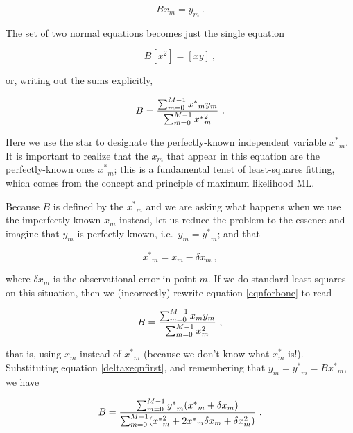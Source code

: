 \documentclass[psfig,preprint]{aastex}
\begin{document}
\begin{mathletters}
\begin{equation}
B x_m = y_m \ .
\end{equation}

\noindent The set of two normal equations becomes just the single equation

\begin{equation}
B [x^2] = [ xy ] \ ,
\end{equation}

\noindent or, writing out the sums explicitly, 

\begin{equation} \label{eqnforbone}
	B = {\sum_{m=0}^{M-1} {x^*}_m y_m \over \sum_{m=0}^{M-1} {x^*}_m^2
} \ .
\end{equation}
\end{mathletters}

	Here we use the star to designate the perfectly-known
independent variable ${x^*}_m$. It is important to realize that the $x_m$
that appear in this equation are the perfectly-known ones ${x^*}_m$; this
is a fundamental tenet of least-squares fitting, which comes from the
concept and principle of maximum likelihood ML.

	Because $B$ is defined by the ${x^*}_m$ and we are asking what
happens when we use the imperfectly known $x_m$ instead, let us reduce
the problem to the essence and imagine that $y_m$ is perfectly known,
i.e.\ $y_m={y^*}_m$; and that 

\begin{equation} \label{deltaxeqnfirst}
{x^*}_m = x_m - \delta x_m \ ,
\end{equation}

\noindent where $\delta x_m$ is the observational error in point $m$. If
we do standard least squares on this situation, then we (incorrectly)
rewrite equation \ref{eqnforbone} to read

\begin{mathletters}
\begin{equation} \label{eqnforbtwo}
B = {\sum_{m=0}^{M-1} x_m y_m \over \sum_{m=0}^{M-1} x_m^2 } \ ,
\end{equation}

\noindent that is, using $x_m$ instead of ${x^*}_m$ (because we don't
know what ${x^*_m}$ is!). Substituting equation \ref{deltaxeqnfirst}, and
remembering that $y_m = {y^*}_m = B {x^*}_m$, we have

\begin{equation} \label{eqnforbthree}
B = {\sum_{m=0}^{M-1} {y^*}_m ({x^*}_m + \delta x_m) \over 
   \sum_{m=0}^{M-1} ({x^*}_m^2 + 2 {{x^*}}_m \delta x_m + \delta x_m^2)} \ .
\end{equation}
\end{mathletters}
\end{document}
